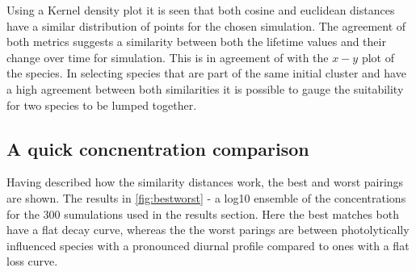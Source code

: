 Using a Kernel density plot it is seen that both cosine and euclidean distances have a similar distribution of points for the chosen simulation. The agreement of both metrics suggests a similarity between both the lifetime values and their change over time for simulation. This is in agreement of with the $x-y$ plot of the species. In selecting species that are part of the same initial cluster and have a high agreement between both similarities it is possible to gauge the suitability for two species to be lumped together. 


\subsection{A quick concnentration comparison}
Having described how the similarity distances work, the best and worst pairings are shown. The results in \autoref{fig:bestworst} - a log10 ensemble of the concentrations for the 300 sumulations used in the results section. Here the best matches both have a flat decay curve, whereas the the worst parings are between photolytically influenced species with a pronounced diurnal profile compared to ones with a flat loss curve.   


